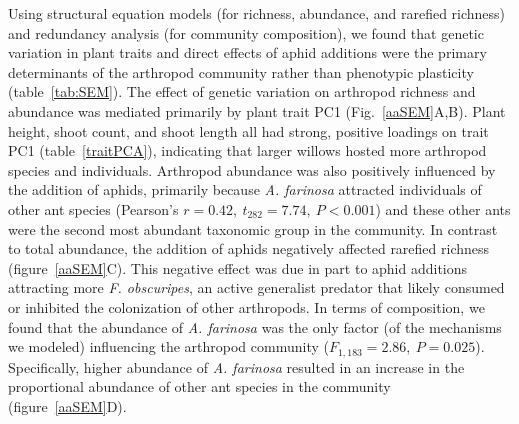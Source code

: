 \documentclass[11pt]{article}
\begin{document}
Using structural equation models (for richness, abundance, and rarefied
richness) and redundancy analysis (for community composition), we found
that genetic variation in plant traits and direct effects of aphid additions
were the primary determinants of the arthropod community rather than
phenotypic plasticity (table~\ref{tab:SEM}). The effect of genetic variation
on arthropod richness and abundance was mediated primarily by plant
trait PC1 (Fig.~\ref{aaSEM}A,B). Plant height, shoot count, and shoot length all
had strong, positive loadings on trait PC1 (table~\ref{traitPCA}), indicating that
larger willows hosted more arthropod species and individuals. Arthropod
abundance was also positively influenced by the addition of aphids,
primarily because \textit{A. farinosa} attracted individuals of other ant species
(Pearson's \(r=0.42,\ t_{282}=7.74,\ P<0.001\)) and these other ants were the second most
abundant taxonomic group in the community. In contrast to total
abundance, the addition of aphids negatively affected rarefied richness
(figure~\ref{aaSEM}C). This negative effect was due in part to aphid additions
attracting more \textit{F. obscuripes}, an active generalist predator that
likely consumed or inhibited the colonization of other arthropods. In
terms of composition, we found that the abundance of \textit{A. farinosa}
was the only factor (of the mechanisms we modeled) influencing the
arthropod community (\(F_{1,183}=2.86,\ P=0.025\)). Specifically, higher abundance
of \textit{A. farinosa} resulted in an increase in the proportional
abundance of other ant species in the community (figure~\ref{aaSEM}D).
\end{document}
